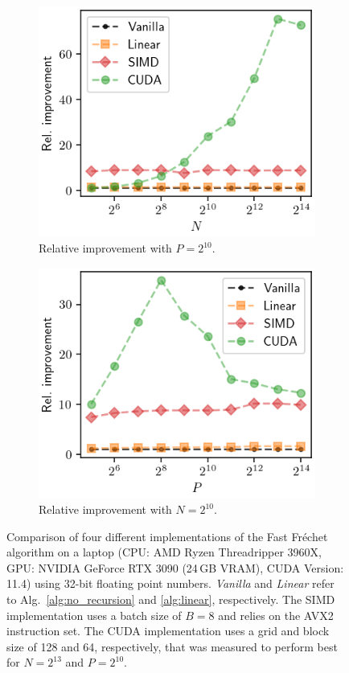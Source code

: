 \begin{figure}[htbp]
\begin{subfigure}{.49\textwidth}
        \includegraphics[width=.8\textwidth]{img/desktop/rel_performance-N.png}
        \caption{Relative improvement with $P = 2^{10}$.}
    \end{subfigure}
    \begin{subfigure}{.49\textwidth}
        \includegraphics[width=.8\textwidth]{img/desktop/rel_performance-pP.png}
        \caption{Relative improvement with $N = 2^{10}$.}
    \end{subfigure}
    \caption{Comparison of four different implementations of the Fast Fr\'echet algorithm on a laptop (CPU: AMD Ryzen Threadripper 3960X, GPU: NVIDIA GeForce RTX 3090 (24\,GB VRAM), CUDA Version: 11.4) using 32-bit floating point numbers. \textit{Vanilla} and \textit{Linear} refer to Alg.~\ref{alg:no_recursion} and \ref{alg:linear}, respectively. The SIMD implementation uses a batch size of $B = 8$ and relies on the AVX2 instruction set. The CUDA implementation uses a grid and block size of 128 and 64, respectively, that was measured to perform best for $N=2^{13}$ and $P=2^{10}$.}
    \label{fig:benchmark_desktop}
\end{figure}
